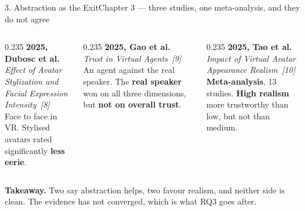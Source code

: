 \documentclass[aspectratio=169,10pt]{beamer}
\newcommand{\hl}[1]{{\color{knblue}\textbf{#1}}}
\newcommand{\bad}[1]{{\color{knred}\textbf{#1}}}
\newcommand{\takeaway}[1]{%
  \vfill
  \noindent\colorbox{knlight}{\parbox{0.975\textwidth}{\small\color{knblue}\textbf{Takeaway.} #1}}%
  \vspace{0.2em}}
\begin{document}
\begin{frame}{3. Abstraction as the Exit}{Chapter 3 — three studies, one meta-analysis, and they do not agree}
\begin{columns}[T]
\begin{column}{0.235\textwidth}
      {\scriptsize\bfseries 2025, Dubosc et al.}\\[0.2em]
      {\tiny\color{knblue}\itshape Effect of Avatar Stylization and Facial Expression Intensity~[8]}\\[0.3em]
      {\scriptsize Face to face in VR. Stylised avatars rated significantly \hl{less eerie}.}
    \end{column}
    \begin{column}{0.235\textwidth}\centering
      {\scriptsize\bfseries 2025, Gao et al.}\\[0.2em]
      {\tiny\color{knblue}\itshape Trust in Virtual Agents~[9]}\\[0.3em]
      {\scriptsize An agent against the real speaker. The \bad{real speaker} won on all three dimensions, but \hl{not on overall trust}.}
    \end{column}
    \begin{column}{0.235\textwidth}\centering
      {\scriptsize\bfseries 2025, Tao et al.}\\[0.2em]
      {\tiny\color{knblue}\itshape Impact of Virtual Avatar Appearance Realism~[10]}\\[0.3em]
      {\scriptsize \hl{Meta-analysis}, 13 studies. \bad{High realism} more trustworthy than low, but not than medium.}
    \end{column}
  \end{columns}
  \takeaway{Two say abstraction helps, two favour realism, and neither side is clean. The evidence has not converged, which is what RQ3 goes after.}
\end{frame}
\end{document}
